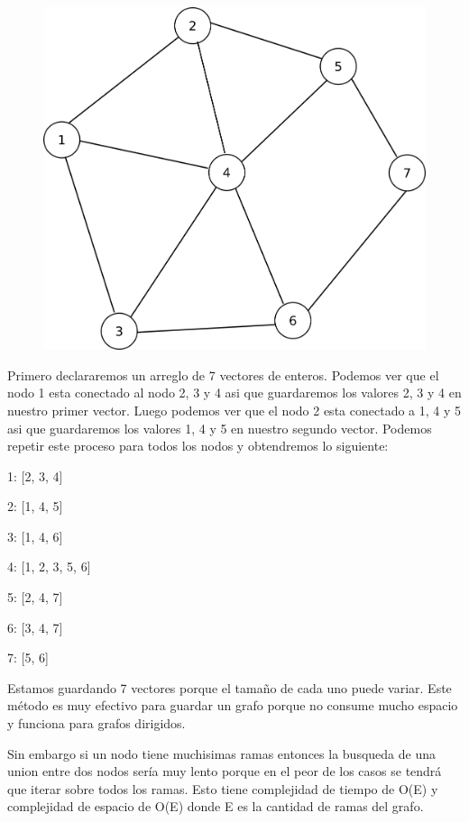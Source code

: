 \documentclass{article}
\begin{document}
\begin{figure}[H]
    \centering
    \includegraphics[width=0.32\paperwidth]{lista}
\end{figure}

Primero declararemos un arreglo de 7 vectores de enteros. Podemos ver que el nodo 1 esta conectado al nodo 2, 3 y 4 asi que guardaremos los valores 2, 3 y 4 en nuestro primer vector. Luego podemos ver que el nodo 2 esta conectado a 1, 4 y 5 asi que guardaremos los valores 1, 4 y 5 en nuestro segundo vector. Podemos repetir este proceso para todos los nodos y obtendremos lo siguiente:

1: [2, 3, 4]

2: [1, 4, 5]

3: [1, 4, 6]

4: [1, 2, 3, 5, 6]

5: [2, 4, 7]

6: [3, 4, 7]

7: [5, 6]

Estamos guardando 7 vectores porque el tamaño de cada uno puede variar. Este método es muy efectivo para guardar un grafo porque no consume mucho espacio y funciona para grafos dirigidos.

Sin embargo si un nodo tiene muchisimas ramas entonces la busqueda de una union entre dos nodos sería muy lento porque en el peor de los casos se tendrá que iterar sobre todos los ramas. Esto tiene complejidad de tiempo de O(E) y complejidad de espacio de O(E) donde E es la cantidad de ramas del grafo.
\end{document}
